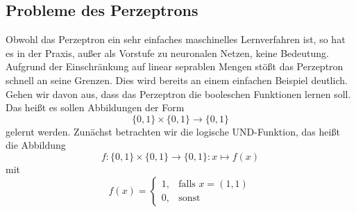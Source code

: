 \documentclass[fontsize=11pt]{scrartcl}
\begin{document}
                \subsection{Probleme des Perzeptrons}
                        Obwohl das Perzeptron ein sehr einfaches maschinelles Lernverfahren ist, so hat es in der Praxis, außer als Vorstufe zu neuronalen Netzen, keine Bedeutung. Aufgrund der Einschränkung auf linear seprablen Mengen stößt das Perzeptron schnell an seine Grenzen.
                        Dies wird bereits an einem einfachen Beispiel deutlich.
                        \newline
                        Gehen wir davon aus, dass das Perzeptron die booleschen Funktionen lernen soll. Das heißt es sollen Abbildungen der Form $$\{0,1\}\times\{0,1\} \rightarrow \{0,1\}$$ gelernt werden.
                        Zunächst betrachten wir die logische UND-Funktion, das heißt die Abbildung
                        $$
                            f:\{0,1\}\times\{0,1\}\rightarrow\{0,1\}: x\mapsto f(x)
                        $$
                        mit
                        $$
                            f(x)=\left\{\begin{array}{cl} 1, & \mbox{falls }x=(1,1)\\
                            0, & \mbox{sonst}\end{array}\right. 
                        $$
\end{document}
